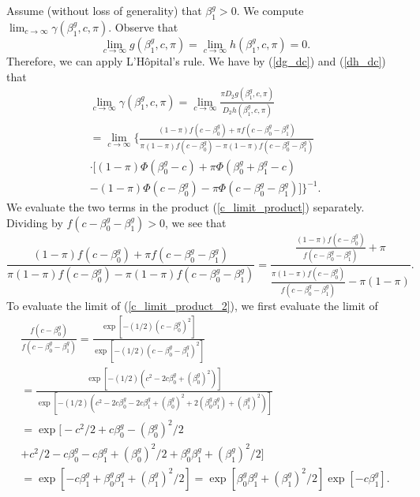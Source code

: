 \documentclass[12pt]{article}
\begin{document}
Assume (without loss of generality) that $\beta^g_1 > 0$. We compute $\lim_{c \to \infty} \gamma(\beta^g_1, c, \pi)$. Observe that $$\lim_{c \to \infty} g(\beta^g_1, c, \pi) = \lim_{c \to \infty} h(\beta^g_1, c, \pi)  = 0.$$ Therefore, we can apply L'H\^{o}pital's rule. We have by (\ref{dg_dc}) and (\ref{dh_dc}) that \begin{multline}\label{c_limit_product}
\lim_{c \to \infty} \gamma(\beta^g_1, c, \pi) = \lim_{c \to \infty} \frac{\pi D_2 g(\beta^g_1, c, \pi)}{D_2h(\beta^g_1, c, \pi)} \\ = \lim_{c \to \infty} \bigg\{ \frac{(1-\pi) f(c - \beta^g_0) + \pi f(c - \beta^g_0 - \beta^g_1)}{\pi (1-\pi) f(c - \beta^g_0) - \pi (1-\pi)f(c - \beta^g_0 - \beta^g_1)} \\ \cdot \bigg[ (1-\pi) \Phi(\beta_0^g - c) + \pi \Phi(\beta^g_0 + \beta^g_1 - c) \\ - (1-\pi) \Phi(c - \beta^g_0) - \pi \Phi(c - \beta_0^g - \beta_1^g) \bigg] \bigg\}^{-1}.
 \end{multline}
 We evaluate the two terms in the product (\ref{c_limit_product}) separately. Dividing by $f(c - \beta^g_0 - \beta^g_1) > 0$, we see that
 \begin{equation}\label{c_limit_product_2}
 \frac{(1-\pi) f(c - \beta^g_0) + \pi f(c - \beta^g_0 - \beta^g_1)}{\pi (1-\pi) f(c - \beta^g_0) - \pi (1-\pi)f(c - \beta^g_0 - \beta^g_1)} = \frac{\frac{(1-\pi) f(c - \beta^g_0)}{ f(c - \beta^g_0 - \beta^g_1)} + \pi}{\frac{ \pi(1-\pi) f(c - \beta^g_0)}{ f(c - \beta^g_0 - \beta^g_1)} - \pi(1-\pi)}.
 \end{equation}
 To evaluate the limit of (\ref{c_limit_product_2}), we first evaluate the limit of
 \begin{multline}\label{c_limit_product_3}
 \frac{f(c - \beta^g_0)}{f(c - \beta^g_0 - \beta^g_1)} = \frac{\exp{[-(1/2)(c - \beta_0^g)^2]}}{\exp{[-(1/2)( c - \beta^g_0 - \beta^g_1)^2]}} \\ = \frac{\exp[ -(1/2)(c^2 - 2 c \beta^g_0 + (\beta^g_0)^2)]}{\exp\left[-(1/2)( c^2 - 2c \beta^g_0 - 2 c \beta^g_1 + (\beta^g_0)^2 + 2( \beta^g_0 \beta^g_1) + (\beta^g_1)^2)\right]} \\ = \exp\big[-c^2/2 + c \beta^g_0 - (\beta^g_0)^2/2 \\ + c^2/2 - c \beta^g_0 - c \beta^g_1 + (\beta^g_0)^2/2 + \beta^g_0 \beta^g_1 + (\beta^g_1)^2/2 \big] \\ = \exp[ -c \beta^g_1 + \beta^g_0 \beta^g_1 + (\beta^g_1)^2/2] = \exp[ \beta^g_0 \beta^g_1 + (\beta^g_1)^2/2]\exp[ -c \beta^g_1]. 
\end{multline}
\end{document}
